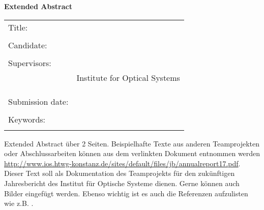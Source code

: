 \thispagestyle{plain}
\vspace*{11pt}
\begin{center}
	{\LARGE \textbf{\textsf{Extended Abstract}}}
\end{center}

\bigskip
\begin{center}
	\begin{tabular}{p{3.2cm}p{9.6cm}}
		Title: & \thema \\
		 & \\
		Candidate: & \autor \\
		 & \\
		Supervisors: & \prueferA \\[.5ex]
		 & Institute for Optical Systems\\[3ex]
		 & \prueferB \\[.5ex]
		 & \firma \\
		 & \\
		Submission date: & \abgabedatum \\
		 & \\
		Keywords: & \schlagworte \\
		 & \\
	\end{tabular}
\end{center}

\bigskip

\noindent
Extended Abstract über 2 Seiten. Beispielhafte Texte aus anderen Teamprojekten oder Abschlussarbeiten können aus dem verlinkten Dokument entnommen werden \href{http://www.ios.htwg-konstanz.de/sites/default/files/jb/annualreport17.pdf}{http://www.ios.htwg-konstanz.de/sites/default/files/jb/annualreport17.pdf}.\\

\noindent Dieser Text soll als Dokumentation des Teamprojekts für den zukünftigen Jahresbericht des Institut für Optische Systeme dienen. Gerne können auch Bilder eingefügt werden. Ebenso wichtig ist es auch die Referenzen aufzulisten wie z.B. \cite{rusu20113d}.

\newpage

